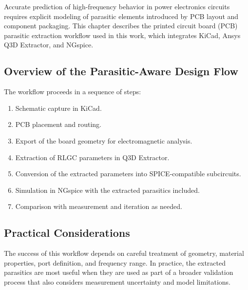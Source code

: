 Accurate prediction of high-frequency behavior in power electronics circuits requires explicit modeling of parasitic elements introduced by PCB layout and component packaging. This chapter describes the printed circuit board (PCB) parasitic extraction workflow used in this work, which integrates KiCad, Ansys Q3D Extractor, and NGspice.

\subsection{Overview of the Parasitic-Aware Design Flow}
The workflow proceeds in a sequence of steps:
\begin{enumerate}
    \item Schematic capture in KiCad.
    \item PCB placement and routing.
    \item Export of the board geometry for electromagnetic analysis.
    \item Extraction of RLGC parameters in Q3D Extractor.
    \item Conversion of the extracted parameters into SPICE-compatible subcircuits.
    \item Simulation in NGspice with the extracted parasitics included.
    \item Comparison with measurement and iteration as needed.
\end{enumerate}

\subsection{Practical Considerations}
The success of this workflow depends on careful treatment of geometry, material properties, port definition, and frequency range. In practice, the extracted parasitics are most useful when they are used as part of a broader validation process that also considers measurement uncertainty and model limitations.
